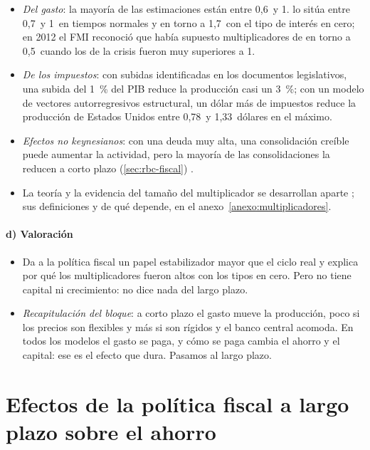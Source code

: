 \documentclass[11pt]{article}
\begin{document}
\begin{itemize}
\item \emph{Del gasto}: la mayoría de las estimaciones están entre 0,6~y 1\nocite{Ramey2019Ten}. \textcite{Hall2009By} lo sitúa entre 0,7~y 1~en tiempos normales y en torno a 1,7~con el tipo de interés en cero; en 2012 el FMI reconoció que había supuesto multiplicadores de en torno a 0,5~cuando los de la crisis fueron muy superiores a 1\nocite{BlanchardLeigh2013Growth}.
\item \emph{De los impuestos}: con subidas identificadas en los documentos legislativos, una subida del 1~\% del PIB reduce la producción casi un 3~\%\nocite{RomerRomer2010Tax}; con un modelo de vectores autorregresivos estructural, un dólar más de impuestos reduce la producción de Estados Unidos entre 0,78~y 1,33~dólares en el máximo\nocite{BlanchardPerotti2002Empirical}.
\item \emph{Efectos no keynesianos}: con una deuda muy alta, una consolidación creíble puede aumentar la actividad, pero la mayoría de las consolidaciones la reducen a corto plazo (\ref{sec:rbc-fiscal}) .
\item La teoría y la evidencia del tamaño del multiplicador se desarrollan aparte  ; sus definiciones y de qué depende, en el anexo~\ref{anexo:multiplicadores}.
\end{itemize}

\paragraph{d) Valoración}

\begin{itemize}
\item Da a la política fiscal un papel estabilizador mayor que el ciclo real y explica por qué los multiplicadores fueron altos con los tipos en cero. Pero no tiene capital ni crecimiento: no dice nada del largo plazo.
\item \emph{Recapitulación del bloque}: a corto plazo el gasto mueve la producción, poco si los precios son flexibles y más si son rígidos y el banco central acomoda. En todos los modelos el gasto se paga, y cómo se paga cambia el ahorro y el capital: ese es el efecto que dura. Pasamos al largo plazo.
\end{itemize}

\section{Efectos de la política fiscal a largo plazo\cortetitulo{} sobre el ahorro}\label{sec:ahorro}
\end{document}
